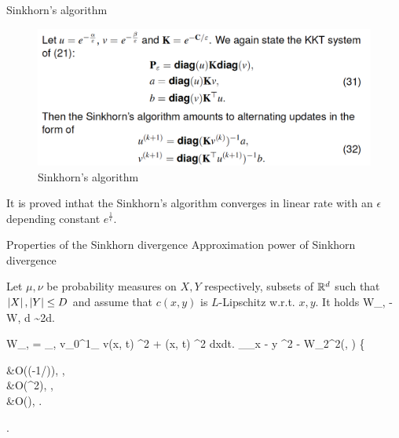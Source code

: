 \documentclass{beamer}
\begin{document}
\begin{frame}{Sinkhorn's algorithm}

\begin{figure}[h]
	\centering
  	\includegraphics[width=\linewidth]{Sinkhorn.png}
  	\caption{Sinkhorn's algorithm}
  	\label{Sinkhorn}
\end{figure}
It is proved in\footnotemark that the Sinkhorn's algorithm converges in linear rate with an $\epsilon$ depending constant $e^{\frac{1}{\epsilon}}$. 
\end{frame}


\begin{frame}{Properties of the Sinkhorn divergence}
	Approximation power of Sinkhorn divergence
	\begin{Thm}[A. Genevay et. al, 2019]
	Let $\mu, \nu$ be probability measures on $X, Y$ respectively, subsets of $\mathbb{R}^d$ such that $\left| X \right|, \left| Y \right| \leq D$ and
assume that $c(x, y)$ is $L$-Lipschitz w.r.t. $x, y$. It holds
		 \leq W_{\epsilon}\lp \mu, \nu \rp - W\lp \mu, \nu \rp {}\epsilon d\log {} \sim 2\epsilon d\log {}.
		\eequ
	\end{Thm}
	\bequn
		W_{\epsilon}\lp \mu, \nu \rp = \inf_{\rho, v}\int_0^1\int_{\Omega} \lp \norml v(x, t) \normr^2 + \norml \nabla \log \rho(x, t) \normr^2 \rp dxdt.
	\eequn
	\bequ
		\lv \mbE_{\pi_{\epsilon}}\norml x - y \normr^2 - W_2^2(\mu, \nu) \rv \leq \left\{
		\begin{aligned}
			&O(\exp(-1/\epsilon)), \quad {},		\\
			&O(\epsilon^2), \quad {},		\\
			&O(\epsilon), \quad {}.		\\
		\end{aligned}\right.
	\eequ
\end{frame}
\end{document}
